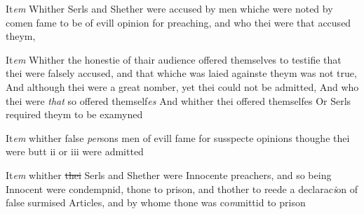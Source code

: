\documentclass[12pt, a4paper]{book}
\begin{document}
            		
            			
				\marginpar[\vspace{0.5cm}{\textcolor{Gray}{6}}]{}
			
            			
		\ifthenelse{\isodd{\thepage}}
		{\reversemarginpar}
		{\normalmarginpar}
		It\textit{em} Whither Serls and Shether were accused by men whiche were noted by comen fame to be of evill opinion for preaching, and who  thei were that accused theym,
            		
            		
            			
				\marginpar[\vspace{0.5cm}{\textcolor{Gray}{7}}]{}
			
            			
		\ifthenelse{\isodd{\thepage}}
		{\reversemarginpar}
		{\normalmarginpar}
		It\textit{em} Whither the honestie of thair audience offered themselves to testifie that thei were falsely accused, and that whiche was laied againste theym was not true, And although thei were a great nomber, yet thei
			 could not be admitted, And who thei were \textit{that} so offered themself\textit{es}
               And whither thei offered themselfes
			 Or Serls required theym to be examyned
            		
            		
            			
				\marginpar[\vspace{0.5cm}{\textcolor{Gray}{8}}]{}
			
            			
		\ifthenelse{\isodd{\thepage}}
		{\reversemarginpar}
		{\normalmarginpar}
		It\textit{em} whither false \textit{per}sons men of evill fame for susspecte opinions thoughe thei were butt ii or iii were admitted
            		
            		
            			
				\marginpar[\vspace{0.5cm}{\textcolor{Gray}{9}}]{}
			
            			
		\ifthenelse{\isodd{\thepage}}
		{\reversemarginpar}
		{\normalmarginpar}
		It\textit{em} whither \sout{thei }
               Serls and Shether
			 were Innocente preachers, and so being Innocent were condempnid, thone to prison, and thother to reede a declarac\textit{i}on of false surmised Articles, and by whome thone was co\textit{m}mittid to prison
            		
\end{document}
